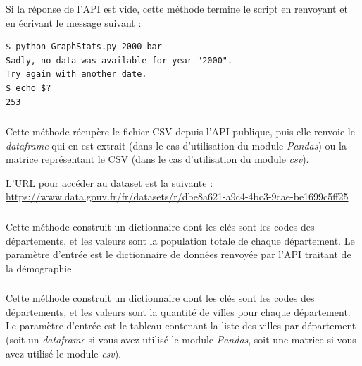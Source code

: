\noindent Si la réponse de l'API est vide, cette méthode termine le script en renvoyant  et en écrivant le message suivant :

\bigskip

\lstset{language=sh}
\begin{lstlisting}[frame=single]
$ python GraphStats.py 2000 bar
Sadly, no data was available for year "2000".
Try again with another date.
$ echo $?
253
\end{lstlisting}


\bigskip


\subsubsection*{}

\noindent Cette méthode récupère le fichier CSV depuis l'API publique, puis elle renvoie le \textit{dataframe} qui en est extrait (dans le cas d'utilisation du module \textit{Pandas}) ou la matrice représentant le CSV (dans le cas d'utilisation du module \textit{csv}).

\noindent L'URL pour accéder au dataset est la suivante : \url{https://www.data.gouv.fr/fr/datasets/r/dbe8a621-a9c4-4bc3-9cae-be1699c5ff25}


\bigskip


\subsubsection*{}

\noindent Cette méthode construit un dictionnaire dont les clés sont les codes des départements, et les valeurs sont la population totale de chaque département.
Le paramètre d'entrée est le dictionnaire de données renvoyée par l'API traitant de la démographie.


\bigskip


\subsubsection*{}

\noindent Cette méthode construit un dictionnaire dont les clés sont les codes des départements, et les valeurs sont la quantité de villes pour chaque département.
Le paramètre d'entrée est le tableau contenant la liste des villes par département (soit un \textit{dataframe} si vous avez utilisé le module \textit{Pandas}, soit une matrice si vous avez utilisé le module \textit{csv}).


